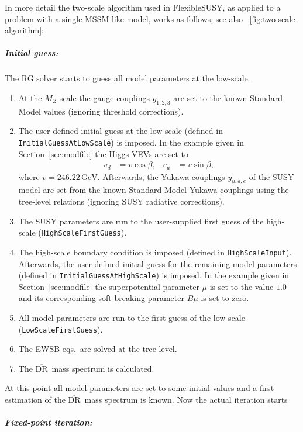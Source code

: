 \documentclass[final,3p,11pt,pdflatex]{elsarticle}
\makeatletter
\newcommand{\fs}{FlexibleSUSY\@\xspace}
\newcommand{\code}[1]{\lstinline|#1|}  %
\newcommand{\textoverline}[1]{$\overline{\mbox{#1}}$}
\newcommand{\DRbar}{\textoverline{DR}\xspace}
\newcommand{\unit}[1]{\,\text{#1}}      %
\newcommand{\figref}[1]{\figurename~\ref{#1}}
\newcommand{\secref}[1]{Section~\ref{#1}}
\makeatother
\begin{document}
In more detail the two-scale algorithm used in \fs,
as applied to a problem with a single MSSM-like model,
works as follows, see also \figref{fig:two-scale-algorithm}:
%
\subparagraph{Initial guess:} The RG solver starts to guess all model
parameters at the low-scale.
%
\begin{enumerate}
\item At the $M_Z$ scale the gauge couplings $g_{1,2,3}$ are set to
  the known Standard Model values (ignoring threshold corrections).
\item The user-defined initial guess at the low-scale (defined in
  \code{InitialGuessAtLowScale}) is imposed.  In the example given in
  \secref{sec:modfile} the Higgs VEVs are set to
  \begin{align}
    v_d &= v \cos\beta, & v_u &= v \sin\beta ,
  \end{align}
  where $v=246.22\unit{GeV}$.  Afterwards, the Yukawa couplings
  $y_{u,d,e}$ of the SUSY model are set from the known Standard Model
  Yukawa couplings using the tree-level relations (ignoring SUSY
  radiative corrections).
\item The SUSY parameters are run to the user-supplied first guess of
  the high-scale (\code{HighScaleFirstGuess}).
\item The high-scale boundary condition is imposed (defined in
  \code{HighScaleInput}).  Afterwards, the user-defined initial guess
  for the remaining model parameters (defined in
  \code{InitialGuessAtHighScale}) is imposed.  In the example given in
  \secref{sec:modfile} the superpotential parameter $\mu$ is set to
  the value $1.0$ and its corresponding soft-breaking parameter $B\mu$
  is set to zero.
\item All model parameters are run to the first guess of the low-scale
  (\code{LowScaleFirstGuess}).
\item The EWSB eqs.\ are solved at the tree-level.
\item The \DRbar\ mass spectrum is calculated.
\end{enumerate}
%
At this point all model parameters are set to some initial values and
a first estimation of the \DRbar\ mass spectrum is known.  Now the
actual iteration starts
%
\subparagraph{Fixed-point iteration:}
%
\end{document}
